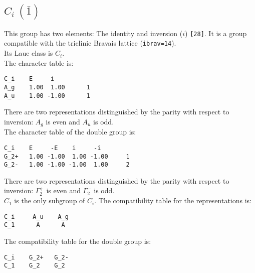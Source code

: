 \documentclass[12pt,a4paper]{article}
\begin{document}
\newpage
\subsection{\color{web-blue}$C_i\ (\bar 1)$}
This group has two elements: The identity and inversion ($i$) \texttt{[28]}.
It is a group compatible with the triclinic Bravais lattice 
(\texttt{ibrav=14}). \\
Its Laue class is $C_i$. \\
The character table is:
\begin{verbatim}
C_i    E     i    
A_g    1.00  1.00      1
A_u    1.00 -1.00      1
\end{verbatim}
There are two representations distinguished by the parity
with respect to inversion: $A_g$ is even and $A_u$ is odd. \\
The character table of the double group is: 
\begin{verbatim}
C_i    E     -E    i     -i   
G_2+   1.00 -1.00  1.00 -1.00     1
G_2-   1.00 -1.00 -1.00  1.00     2
\end{verbatim}
There are two representations distinguished by the parity
with respect to inversion: $\Gamma_2^+$ is even and $\Gamma_2^-$ is odd.\\
$C_1$ is the only subgroup of $C_i$. The compatibility table for the
representations is:
\begin{verbatim}
C_i     A_u    A_g
C_1      A      A
\end{verbatim}
The compatibility table for the double group is:
\begin{verbatim}
C_i    G_2+   G_2- 
C_1    G_2    G_2
\end{verbatim}

\newpage
\end{document}
